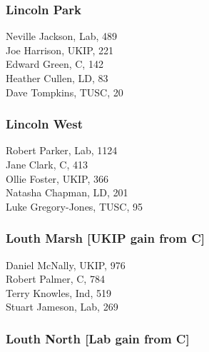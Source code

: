 \documentclass[a4paper,openany,10pt]{book}
\begin{document}
\subsubsection*{Lincoln Park}



Neville Jackson, Lab, 489\\
Joe Harrison, UKIP, 221\\
Edward Green, C, 142\\
Heather Cullen, LD, 83\\
Dave Tompkins, TUSC, 20\\


\subsubsection*{Lincoln West}



Robert Parker, Lab, 1124\\
Jane Clark, C, 413\\
Ollie Foster, UKIP, 366\\
Natasha Chapman, LD, 201\\
Luke Gregory-Jones, TUSC, 95\\


\subsubsection*{Louth Marsh \hspace*{\fill}\nolinebreak[1]%
\enspace\hspace*{\fill}
[UKIP gain from C]}



Daniel McNally, UKIP, 976\\
Robert Palmer, C, 784\\
Terry Knowles, Ind, 519\\
Stuart Jameson, Lab, 269\\


\subsubsection*{Louth North \hspace*{\fill}\nolinebreak[1]%
\enspace\hspace*{\fill}
[Lab gain from C]}
\end{document}
